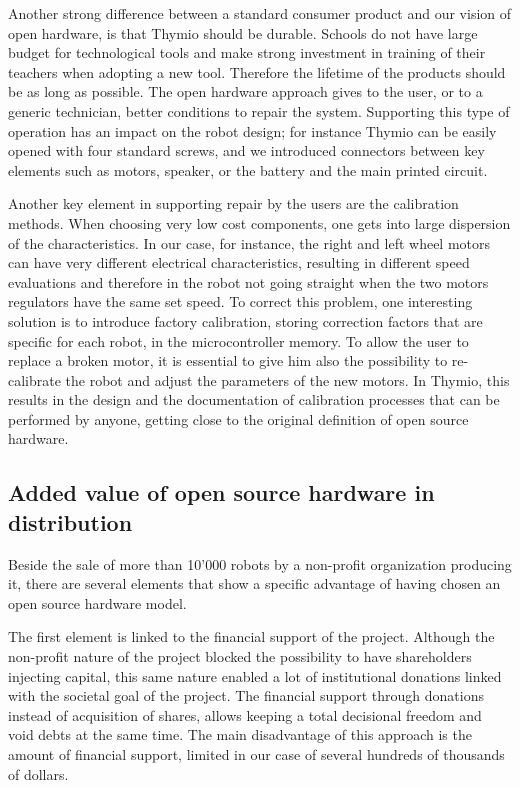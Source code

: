 \documentclass[letterpaper, 10 pt, conference]{ieeeconf}  %
\begin{document}
Another strong difference between a standard consumer product and our vision of open hardware, is that Thymio should be durable.
Schools do not have large budget for technological tools and make strong investment in training of their teachers when adopting a new tool.
Therefore the lifetime of the products should be as long as possible. 
The open hardware approach gives to the user, or to a generic technician, better conditions to repair the system.
Supporting this type of operation has an impact on the robot design; for instance Thymio can be easily opened with four standard screws, and we introduced connectors between key elements such as motors, speaker, or the battery and the main printed circuit. 

Another key element in supporting repair by the users are the calibration methods. 
When choosing very low cost components, one gets into large dispersion of the characteristics. 
In our case, for instance, the right and left wheel motors can have very different electrical characteristics, resulting in different speed evaluations and therefore in the robot not going straight when the two motors regulators have the same set speed.
To correct this problem, one interesting solution is to introduce factory calibration, storing correction factors that are specific for each robot, in the microcontroller memory. 
To allow the user to replace a broken motor, it is essential to give him also the possibility to re-calibrate the robot and adjust the parameters of the new motors.
In Thymio, this results in the design and the documentation of calibration processes that can be performed by anyone, getting close to the original definition of open source hardware.

\subsection{Added value of open source hardware in distribution}

Beside the sale of more than 10'000 robots by a non-profit organization producing it, there are several elements that show a specific advantage of having chosen an open source hardware model.

The first element is linked to the financial support of the project.
Although the non-profit nature of the project blocked the possibility to have shareholders injecting capital, this same nature enabled a lot of institutional donations linked with the societal goal of the project.
The financial support through donations instead of acquisition of shares, allows keeping a total decisional freedom and void debts at the same time.
The main disadvantage of this approach is the amount of financial support, limited in our case of several hundreds of thousands of dollars. 
\end{document}
